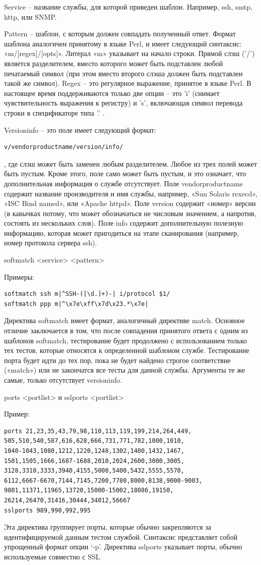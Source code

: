 \documentclass[12pt,a4paper]{report}
\begin{document}
Service – название службы, для которой приведен шаблон. Например, ssh, smtp, http, или SNMP.

Pattern – шаблон, с которым должен совпадать полученный ответ. Формат шаблона аналогичен принятому в языке Perl, и имеет следующий синтаксис: «m/[regex]/[opts]». Литерал «m» указывает на начало строки. Прямой слэш ('/') является разделителем, вместо которого может быть подставлен любой печатаемый символ (при этом вместо второго слэша должен быть подставлен такой же символ). Regex – это регулярное выражение, принятое в языке Perl. В настоящее время поддерживаются только две опции – это 'i' (снимает чувствительность выражения к регистру) и 's', включающая символ перевода строки в спецификаторе типа '.' .

Versioninfo – это поле имеет следующий формат: 
\begin{lstlisting}[breaklines]
v/vendorproductname/version/info/\end{lstlisting}
, где слэш может быть заменен любым разделителем. Любое из трех полей может быть пустым. Кроме этого, поле само может быть пустым, и это означает, что дополнительная информация о службе отсутствует. Поле vendorproductname содержит название производителя и имя службы, например, «Sun Solaris rexecd», «ISC Bind named», или «Apache httpd». Поле version содержит «номер» версии (в кавычках потому, что может обозначаться не числовым значением, а напротив, состоять из нескольких слов). Поле info содержит дополнительную полезную информацию, которая может пригодиться на этапе сканирования (например, номер протокола сервера ssh).


softmatch <service> <pattern>

Примеры:
\begin{verbatim}
softmatch ssh m|^SSH-([\d.]+)-| i/protocol $1/
softmatch ppp m|^\x7e\xff\x7d\x23.*\x7e|
\end{verbatim}
Директива softmatch имеет формат, аналогичный директиве match. Основное отличие заключается в том, что после совпадения принятого ответа с одним из шаблонов softmatch, тестирование будет продолжено с использованием только тех тестов, которые относятся к определенной шаблоном службе. Тестирование порта будет идти до тех пор, пока не будет найдено строгое соответствие («match») или не закончатся все тесты для данной службы. Аргументы те же самые, только отсутствует versioninfo.

ports <portlist> и sslports <portlist>

Пример:
\begin{lstlisting}[breaklines]
ports 21,23,35,43,79,98,110,113,119,199,214,264,449,
505,510,540,587,616,628,666,731,771,782,1000,1010,
1040-1043,1080,1212,1220,1248,1302,1400,1432,1467,
1501,1505,1666,1687-1688,2010,2024,2600,3000,3005,
3128,3310,3333,3940,4155,5000,5400,5432,5555,5570,
6112,6667-6670,7144,7145,7200,7780,8000,8138,9000-9003,
9801,11371,11965,13720,15000-15002,18086,19150,
26214,26470,31416,30444,34012,56667
sslports 989,990,992,995
\end{lstlisting}
Эта директива группирует порты, которые обычно закрепляются за идентифицируемой данным тестом службой. Синтаксис представляет собой упрощенный формат опции ‘-p’. Директива sslports указывает порты, обычно используемые совместно с SSL
\end{document}
